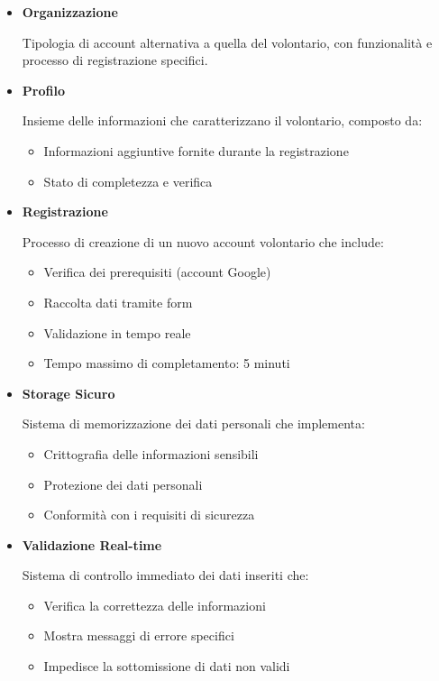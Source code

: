 \begin{itemize}
\item \textbf{Organizzazione}

Tipologia di account alternativa a quella del volontario, con funzionalità e processo di registrazione specifici.

\item \textbf{Profilo}

Insieme delle informazioni che caratterizzano il volontario, composto da:
\begin{itemize}
    \item Informazioni aggiuntive fornite durante la registrazione
    \item Stato di completezza e verifica
\end{itemize}

\item \textbf{Registrazione}

Processo di creazione di un nuovo account volontario che include:
\begin{itemize}
    \item Verifica dei prerequisiti (account Google)
    \item Raccolta dati tramite form
    \item Validazione in tempo reale
    \item Tempo massimo di completamento: 5 minuti
\end{itemize}

\item \textbf{Storage Sicuro}

Sistema di memorizzazione dei dati personali che implementa:
\begin{itemize}
    \item Crittografia delle informazioni sensibili
    \item Protezione dei dati personali
    \item Conformità con i requisiti di sicurezza
\end{itemize}

\item \textbf{Validazione Real-time}

Sistema di controllo immediato dei dati inseriti che:
\begin{itemize}
    \item Verifica la correttezza delle informazioni
    \item Mostra messaggi di errore specifici
    \item Impedisce la sottomissione di dati non validi
\end{itemize}


\end{itemize}
